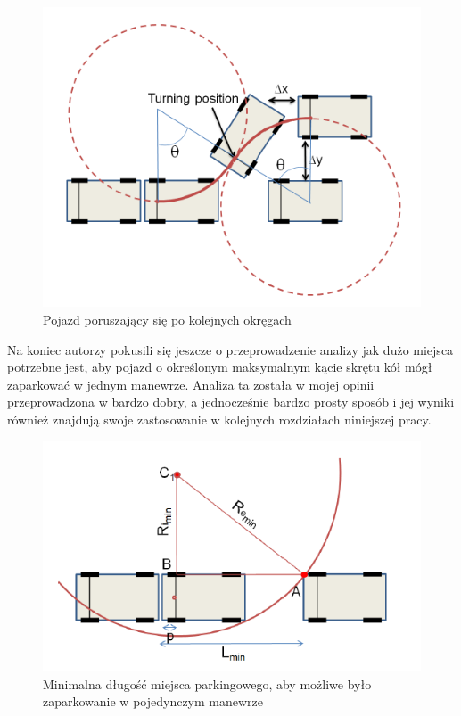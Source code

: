 \documentclass[a4paper,11pt,twoside]{report}
\theoremstyle{definition}
\begin{document}
\begin{figure}[h!]
\centering
\includegraphics[scale=0.6]{easyPathPlanning2}
\caption[Pojazd poruszający się po kolejnych okręgach]{Pojazd poruszający się po kolejnych okręgach}
\end{figure}

Na koniec autorzy pokusili się jeszcze o przeprowadzenie analizy jak dużo miejsca potrzebne jest, aby pojazd o określonym maksymalnym kącie skrętu kół mógł zaparkować w jednym manewrze. Analiza ta została w mojej opinii przeprowadzona w bardzo dobry, a jednocześnie bardzo prosty sposób i jej wyniki również znajdują swoje zastosowanie w kolejnych rozdziałach niniejszej pracy.

\begin{figure}[h!]
\centering
\includegraphics[scale=0.6]{easyPathPlanning3}
\caption[Minimalna długość miejsca parkingowego, aby możliwe było zaparkowanie w pojedynczym manewrze]{Minimalna długość miejsca parkingowego, aby możliwe było zaparkowanie w pojedynczym manewrze}
\end{figure}
\end{document}
